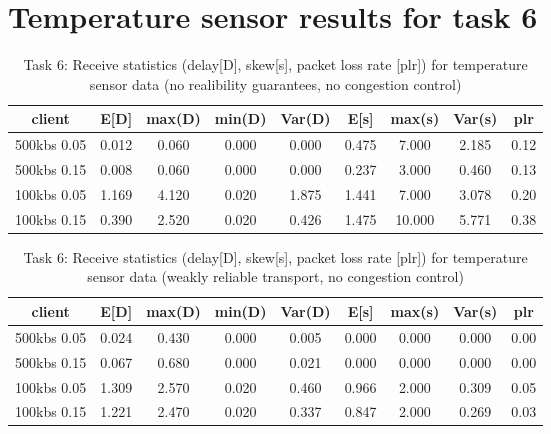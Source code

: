\chapter{Temperature sensor results for task 6}
\label{appendix:task6}

\begin{table}
\centering
\begin{tabular}{|c|c|c|c|c|c|c|c|c|}
\hline
client & E[D] & max(D) & min(D) & Var(D) & E[s] & max(s) & Var(s) & plr\\
\hline
500kbs 0.05 & 0.012 & 0.060 & 0.000 & 0.000 & 0.475 & 7.000 & 2.185 & 0.12 \\
\hline
500kbs 0.15 & 0.008 & 0.060 & 0.000 & 0.000 & 0.237 & 3.000 & 0.460 & 0.13 \\
\hline
100kbs 0.05 & 1.169 & 4.120 & 0.020 & 1.875 & 1.441 & 7.000 &  3.078 & 0.20  \\
\hline
100kbs 0.15 & 0.390 & 2.520 & 0.020 & 0.426 & 1.475 & 10.000 & 5.771 & 0.38 \\
\hline
\end{tabular}
\caption{Task 6: Receive statistics (delay[D], skew[s], packet loss rate [plr]) for temperature sensor data (no realibility guarantees, no congestion control)}
\label{table:task6-temp-a}
\end{table}



\begin{table}
\centering
\begin{tabular}{|c|c|c|c|c|c|c|c|c|}
\hline
client & E[D] & max(D) & min(D) & Var(D) & E[s] & max(s) & Var(s) & plr\\
\hline
500kbs 0.05 & 0.024 & 0.430 & 0.000 & 0.005 & 0.000 & 0.000 & 0.000 & 0.00 \\
\hline
500kbs 0.15 & 0.067 & 0.680 & 0.000 & 0.021 & 0.000 & 0.000 & 0.000 & 0.00 \\
\hline
100kbs 0.05 & 1.309 & 2.570 & 0.020 & 0.460 & 0.966 & 2.000 & 0.309 & 0.05 \\
\hline
100kbs 0.15 & 1.221 & 2.470 & 0.020 & 0.337 & 0.847 & 2.000 & 0.269 & 0.03 \\
\hline
\end{tabular}
\caption{Task 6: Receive statistics (delay[D], skew[s], packet loss rate [plr]) for temperature sensor data (weakly reliable transport, no congestion control) }
\label{table:task6-camera-c}
\end{table}

